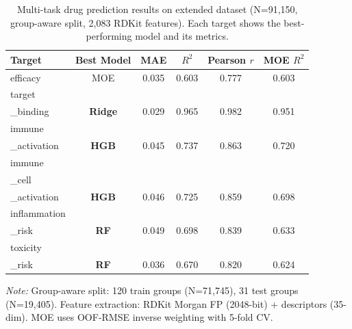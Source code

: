 \begin{table}[htbp]
\centering
\caption{Multi-task drug prediction results on extended dataset (N=91,150, group-aware split, 2,083 RDKit features). Each target shows the best-performing model and its metrics.}
\label{tab:drug_multitask}
\begin{tabular}{lccccc}
\toprule
Target & Best Model & MAE & $R^2$ & Pearson $r$ & MOE $R^2$ \\
\midrule
efficacy & MOE & 0.035 & 0.603 & 0.777 & 0.603 \\
target\\_binding & \textbf{Ridge} & 0.029 & 0.965 & 0.982 & 0.951 \\
immune\\_activation & \textbf{HGB} & 0.045 & 0.737 & 0.863 & 0.720 \\
immune\\_cell\\_activation & \textbf{HGB} & 0.046 & 0.725 & 0.859 & 0.698 \\
inflammation\\_risk & \textbf{RF} & 0.049 & 0.698 & 0.839 & 0.633 \\
toxicity\\_risk & \textbf{RF} & 0.036 & 0.670 & 0.820 & 0.624 \\
\bottomrule
\end{tabular}
\footnotesize {\textit{Note:} Group-aware split: 120 train groups (N=71,745), 31 test groups (N=19,405). Feature extraction: RDKit Morgan FP (2048-bit) + descriptors (35-dim). MOE uses OOF-RMSE inverse weighting with 5-fold CV.}
\end{table}
